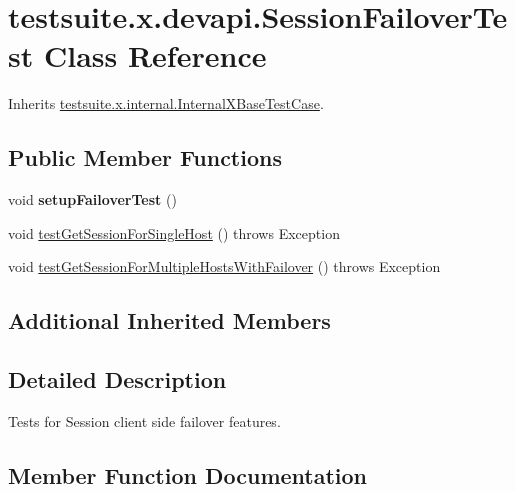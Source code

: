 \hypertarget{classtestsuite_1_1x_1_1devapi_1_1_session_failover_test}{}\section{testsuite.\+x.\+devapi.\+Session\+Failover\+Test Class Reference}
\label{classtestsuite_1_1x_1_1devapi_1_1_session_failover_test}


Inherits \mbox{\hyperlink{classtestsuite_1_1x_1_1internal_1_1_internal_x_base_test_case}{testsuite.\+x.\+internal.\+Internal\+X\+Base\+Test\+Case}}.

\subsection*{Public Member Functions}
\begin{DoxyCompactItemize}
\item 
\mbox{\label{classtestsuite_1_1x_1_1devapi_1_1_session_failover_test_a1b109bdde6c1adf990abcb54facd0784}} 
void {\bfseries setup\+Failover\+Test} ()
\item 
void \mbox{\hyperlink{classtestsuite_1_1x_1_1devapi_1_1_session_failover_test_a7bada9d526863798fc56ec329319b703}{test\+Get\+Session\+For\+Single\+Host}} ()  throws Exception 
\item 
void \mbox{\hyperlink{classtestsuite_1_1x_1_1devapi_1_1_session_failover_test_aa33c73b0634b7c45783b503670a34556}{test\+Get\+Session\+For\+Multiple\+Hosts\+With\+Failover}} ()  throws Exception 
\end{DoxyCompactItemize}
\subsection*{Additional Inherited Members}


\subsection{Detailed Description}
Tests for Session client side failover features. 

\subsection{Member Function Documentation}
\mbox{\label{classtestsuite_1_1x_1_1devapi_1_1_session_failover_test_aa33c73b0634b7c45783b503670a34556}} 
